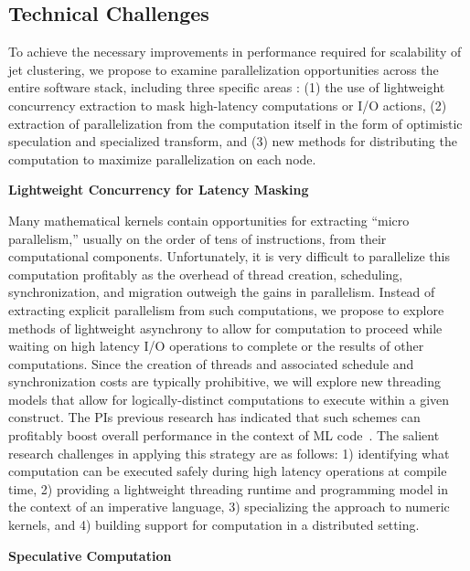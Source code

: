 \documentclass[times,11pt]{article}
\begin{document}
\subsection{Technical Challenges}

To achieve the necessary improvements in performance required for scalability
of jet clustering, we propose to examine parallelization opportunities across
the entire software stack, including three specific areas : 
(1) the use of lightweight concurrency
extraction to mask high-latency computations or I/O actions, 
(2) extraction of
parallelization from the computation itself in the form of optimistic speculation
and specialized transform, and
(3) new methods for distributing the computation to
maximize parallelization on each node. 


\bigskip
\noindent
{\bf  Lightweight Concurrency for Latency Masking}
\bigskip

Many mathematical kernels contain opportunities for extracting ``micro parallelism,''
usually on the order of tens of instructions, from their computational components. 
Unfortunately, it is very difficult to parallelize this computation profitably as
the overhead of thread creation, scheduling, synchronization, and migration outweigh
the gains in parallelism. Instead of extracting explicit parallelism from such
computations, we propose to explore methods of lightweight asynchrony to allow for
computation to proceed while waiting on high latency I/O operations to complete or
the results of other computations. Since the creation of threads and associated
schedule and synchronization costs are typically prohibitive, we will explore new
threading models that allow for logically-distinct computations to execute within
a given construct. The PIs previous research has indicated that such schemes can profitably
boost overall performance in the context of ML code~\cite{acml, parasites}. 
The salient research
challenges in applying this strategy are as follows:  1) identifying what computation can be executed
safely during high latency operations at compile time, 2) providing a lightweight threading runtime
and programming model in the context of an imperative language, 
3) specializing the approach to numeric kernels,
and 4) building support for computation in a distributed setting.

\bigskip
\noindent
{\bf Speculative Computation}
\bigskip
\end{document}

